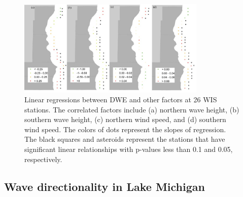 \begin{figure}[htbp]
  \centering
  \includegraphics[width=0.8\textwidth]{chapter3/resources/figure3-10.jpg}
  \caption{Linear regressions between DWE and other factors at 26 WIS stations. The correlated factors include (a) northern wave height, (b) southern wave height, (c) northern wind speed, and (d) southern wind speed. The colors of dots represent the slopes of regression. The black squares and asteroids represent the stations that have significant linear relationships with p-values less than 0.1 and 0.05, respectively.}
  \label{fig:fig3.10}
\end{figure}

\subsection{Wave directionality in Lake Michigan}
\label{Wave directionality in Lake Michigan}


